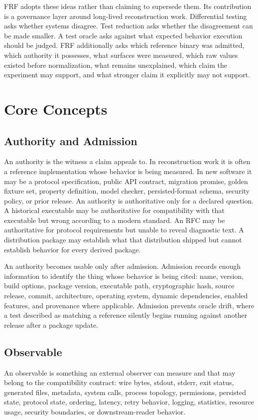 \documentclass[11pt,a4paper]{article}
\newcommand{\frf}{\textsc{FRF}}
\begin{document}
\frf{} adopts these ideas rather than claiming to supersede them. Its contribution is a governance layer around long-lived reconstruction work. Differential testing asks whether systems disagree. Test reduction asks whether the disagreement can be made smaller. A test oracle asks against what expected behavior execution should be judged. \frf{} additionally asks which reference binary was admitted, which authority it possesses, what surfaces were measured, which raw values existed before normalization, what remains unexplained, which claim the experiment may support, and what stronger claim it explicitly may not support.

\section{Core Concepts}
\label{sec:concepts}

\subsection{Authority and Admission}
An authority is the witness a claim appeals to. In reconstruction work it is often a reference implementation whose behavior is being measured. In new software it may be a protocol specification, public API contract, migration promise, golden fixture set, property definition, model checker, persisted-format schema, security policy, or prior release. An authority is authoritative only for a declared question. A historical executable may be authoritative for compatibility with that executable but wrong according to a modern standard. An RFC may be authoritative for protocol requirements but unable to reveal diagnostic text. A distribution package may establish what that distribution shipped but cannot establish behavior for every derived package.

An authority becomes usable only after admission. Admission records enough information to identify the thing whose behavior is being cited: name, version, build options, package version, executable path, cryptographic hash, source release, commit, architecture, operating system, dynamic dependencies, enabled features, and provenance where applicable. Admission prevents oracle drift, where a test described as matching a reference silently begins running against another release after a package update.

\subsection{Observable}
An observable is something an external observer can measure and that may belong to the compatibility contract: wire bytes, stdout, stderr, exit status, generated files, metadata, system calls, process topology, permissions, persisted state, protocol state, ordering, latency, retry behavior, logging, statistics, resource usage, security boundaries, or downstream-reader behavior.
\end{document}
